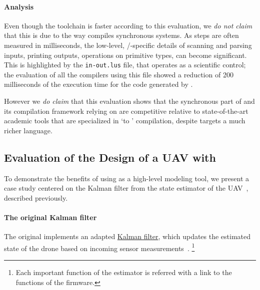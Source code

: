 \paragraph{Analysis}
Even though the \GRSync toolchain is faster according to this evaluation, we \emph{do not claim}
that this is due to the way \GRSync compiles synchronous systems. As steps are often measured in
milliseconds, the low-level, \Ci/\Rust-specific details of scanning and parsing inputs, printing
outputs, operations on primitive types, \etc can become significant. This is highlighted by the
\texttt{in-out.lus} file, that operates as a scientific control; the evaluation of all the compilers
using this file showed a reduction of 200 milliseconds of the execution time for the code generated
by \GRSync.

However we \emph{do claim} that this evaluation shows that the synchronous part of \GRust and its
compilation framework relying on \Rust are competitive relative to state-of-the-art academic tools
that are specialized in `\Lustre to \Ci' compilation, despite \GRust targets a much richer language.

\subsection{Evaluation of the Design of a UAV with \GRust}
\label{sec:grust:benchmarks:eval_grust_design}

To demonstrate the benefits of using \GRust as a high-level modeling tool, we present a case study
centered on the Kalman filter from the state estimator of the \crazyflie UAV~\cite{crazyflie-fm},
described previously.

\paragraph{The original Kalman filter}
The original implements an adapted
\href{https://github.com/bitcraze/crazyflie-firmware/blob/b9d676aa3544b68eea17d11b0fbec437da909878/src/modules/src/kalman_core/kalman_core.c}
{Kalman filter}, which updates the estimated state of the drone based on incoming sensor
measurements~\cite{DBLP:conf/icra/MullerHD15,MuellerCovariance2016}.%
\footnote{
    Each important function of the estimator is referred with a link to the \Ci functions of the
    \crazyflie firmware.
}

